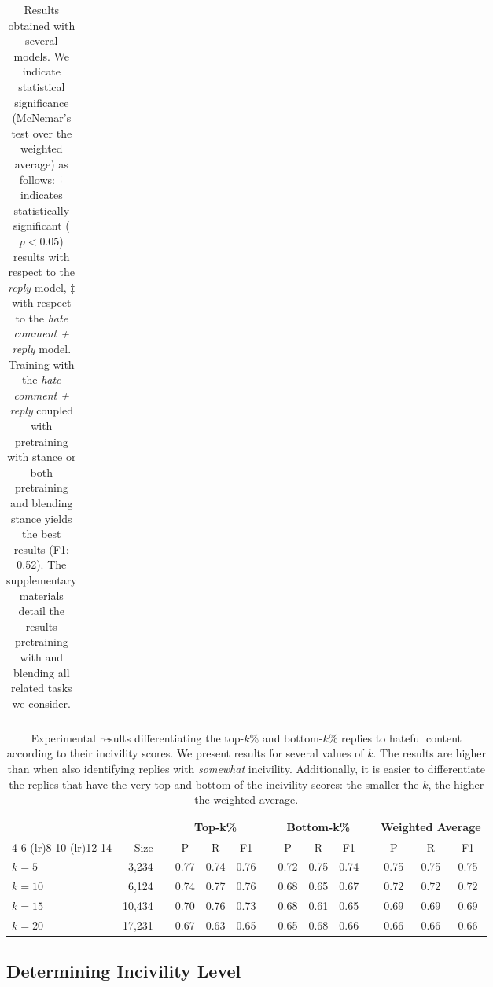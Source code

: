 \documentclass[11pt]{article}
\begin{document}
\begin{table*}[ht!]
\begin{tabular}{l ccc ccc ccc ccc}
		\end{tabular}
		\caption{Results obtained with several models. 
			We indicate statistical significance (McNemar’s test \cite{mcnemar1947note} over the weighted average) as follows: 
			† indicates statistically significant ($p<0.05$) results with respect to the \emph{reply} model, ‡ with respect to the \emph{hate comment + reply} model.
			Training with the \emph{hate comment + reply}
			coupled with pretraining with stance or both pretraining and blending stance yields the best results (F1: 0.52).
			The supplementary materials detail the results pretraining with and blending all related tasks we consider.}
		\label{t:model-results}
	\end{table*}
	
	\begin{table*}
		\small
		\centering	
		\begin{tabular}{lrl  cccc cccc ccc}
			\toprule
			\multicolumn{3}{c}{} & \multicolumn{3}{c}{Top-k\%} && \multicolumn{3}{c}{Bottom-k\%} && \multicolumn{3}{c}{Weighted Average}  \\ \cmidrule(lr){4-6} \cmidrule(lr){8-10} \cmidrule(lr){12-14} 
			& Size && P & R & F1 && P & R & F1 && P & R & F1  \\ \midrule
			$\mathit{k}=5$  &  3,234 &&0.77 & 0.74 & 0.76 && 0.72 & 0.75 & 0.74	&& 0.75 & 0.75 & 0.75 \\
			$\mathit{k}=10$ &  6,124 && 0.74 & 0.77 & 0.76 && 0.68 & 0.65 & 0.67 && 0.72 & 0.72 & 0.72 \\
			$\mathit{k}=15$ & 10,434 && 0.70 & 0.76 & 0.73 && 0.68 & 0.61 & 0.65 && 0.69 & 0.69 & 0.69 \\
			$\mathit{k}=20$ & 17,231 && 0.67 & 0.63 & 0.65 && 0.65 & 0.68 & 0.66  && 0.66 & 0.66 & 0.66 \\ \bottomrule
			
		\end{tabular}
		\caption{Experimental results differentiating the top-$k$\% and bottom-$k$\% replies to hateful content according to their incivility scores.
			We present results for several values of $k$.
			The results are higher than when also identifying replies with \emph{somewhat} incivility.
			Additionally, it is easier to differentiate the replies that have the very top and bottom of the incivility scores: the smaller the $k$, the higher the weighted average.
		}
		\label{t:model-optimalk}
	\end{table*}
	
	\subsection{Determining Incivility Level}
	\label{ss:levels}
	
\end{document}
